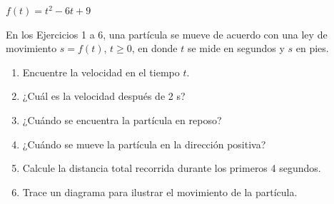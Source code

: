 \item $f(t) = t^2 - 6t + 9$
\par
En los Ejercicios 1 a 6, una partícula se mueve de acuerdo con una ley de movimiento $s = f(t)$, $t \ge 0$, en donde $t$ se mide en segundos y $s$ en pies.
\begin{enumerate}
    \item[(a)] Encuentre la velocidad en el tiempo $t$.
    \item[(b)] ¿Cuál es la velocidad después de 2 s?
    \item[(c)] ¿Cuándo se encuentra la partícula en reposo?
    \item[(d)] ¿Cuándo se mueve la partícula en la dirección positiva?
    \item[(e)] Calcule la distancia total recorrida durante los primeros 4 segundos.
    \item[(f)] Trace un diagrama para ilustrar el movimiento de la partícula.
\end{enumerate}
